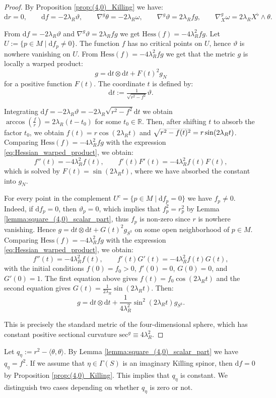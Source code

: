 \documentclass[10pt,a4paper,twoside,reqno]{amsart}
\theoremstyle{plain}
\theoremstyle{definition}
\theoremstyle{remark}
\def\R{\mathbb{R}}
\def\dd{\mathrm{d}}
\def\R{\mathbb{R}}
\def\dd{\mathrm{d}}
\newcommand{\escal}[1]{\langle#1\rangle}
\def\Hess{\mathrm{Hess}}
\begin{document}
\begin{proof}
    By Proposition \ref{prop:(4,0)_Killing} we have: $$\dd r=0,\qquad \dd f=-2\lambda_R\vartheta,\qquad \nabla^g\theta=-2\lambda_R\omega,\qquad \nabla^g\vartheta=2\lambda_Rfg,\qquad \nabla^g_X\omega=2\lambda_RX^\flat\wedge\theta.$$

    From $\dd f=-2\lambda_R\vartheta$ and $\nabla^g\vartheta=2\lambda_Rfg$ we get $\Hess(f)=-4\lambda_R^2fg$. Let $U:=\{p\in M\mid \dd f_p\neq0\}$. The function $f$ has no critical points on $U$, hence $\vartheta$ is nowhere vanishing on $U$. From $\Hess(f)=-4\lambda_R^2fg$ we get that the metric $g$ is locally a warped product: $$g=\dd t\otimes\dd t+F(t)^2g_N$$ for a positive function $F(t)$. The coordinate $t$ is defined by: $$\dd t:=\tfrac{1}{\sqrt{r^2-f^2}}\vartheta.$$

    Integrating $\dd f=-2\lambda_R\vartheta=-2\lambda_R\sqrt{r^2-f^2}\dd t$ we obtain $\arccos(\frac{f}{r})=2\lambda_R(t-t_0)$ for some $t_0\in\R$. Then, after shifting $t$ to absorb the factor $t_0$, we obtain $f(t)=r\cos(2\lambda_Rt)$ and $\smash{\sqrt{r^2-f(t)^2}}=r\sin(2\lambda_Rt)$. Comparing $\Hess(f)=-4\lambda_R^2fg$ with the expression \eqref{eq:Hessian_warped_product}, we obtain: $$f''(t)=-4\lambda_R^2f(t),\qquad f'(t)F'(t)=-4\lambda_R^2f(t)F(t),$$ which is solved by $F(t)=\sin(2\lambda_Rt)$, where we have absorbed the constant into $g_N$.\medskip

    For every point in the complement $U^c=\{p\in M\mid \dd f_p=0\}$ we have $f_p\neq0$. Indeed, if $\dd f_p=0$, then $\vartheta_p=0$, which implies that $f^2_p=r^2_p$ by Lemma \ref{lemma:square_(4,0)_scalar_part}, thus $f_p$ is non-zero since $r$ is nowhere vanishing. Hence $g=\dd t\otimes\dd t+G(t)^2g_{S^3}$ on some open neighborhood of $p\in M$. Comparing $\Hess(f)=-4\lambda_R^2fg$ with the expression \eqref{eq:Hessian_warped_product}, we obtain: $$f''(t)=-4\lambda_R^2f(t),\qquad f'(t)G'(t)=-4\lambda_R^2f(t)G(t),$$ with the initial conditions $f(0)=f_0>0$, $f'(0)=0$, $G(0)=0$, and $G'(0)=1$. The first equation above gives $f(t)=f_0\cos(2\lambda_Rt)$ and the second equation gives $G(t)=\frac{1}{2\lambda_R}\sin(2\lambda_Rt)$. Then: $$g=\dd t\otimes\dd t+\frac{1}{4\lambda_R^2}\sin^2(2\lambda_Rt)g_{S^3}.$$
    
    This is precisely the standard metric of the four-dimensional sphere, which has constant positive sectional curvature $\mathrm{sec}^g\equiv4\lambda_R^2$.
\end{proof}

Let $q_\eta:=r^2-\escal{\theta,\theta}$. By Lemma \ref{lemma:square_(4,0)_scalar_part} we have $q_\eta=f^2$. If we assume that $\eta\in\Gamma(S)$ is an imaginary Killing spinor, then $\dd f=0$ by Proposition \ref{prop:(4,0)_Killing}. This implies that $q_\eta$ is constant. We distinguish two cases depending on whether $q_\eta$ is zero or not.
\end{document}
